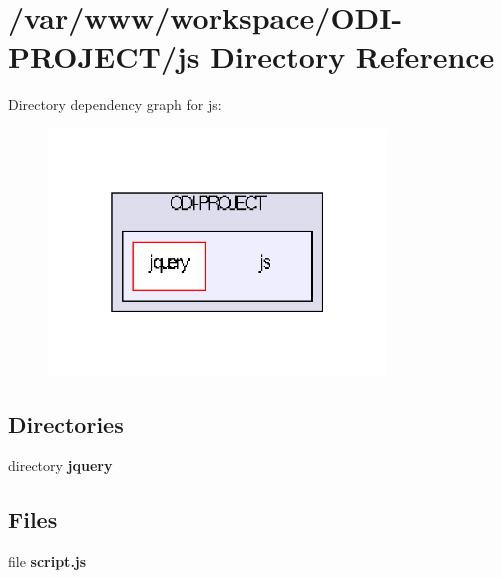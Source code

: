 \section{/var/www/workspace/\+O\+D\+I-\/\+P\+R\+O\+J\+E\+C\+T/js Directory Reference}
\label{dir_df3b9a83a1cda829cd6b2f25cbf1d429}
Directory dependency graph for js\+:\nopagebreak
\begin{figure}[H]
\begin{center}
\leavevmode
\includegraphics[width=254pt]{dir_df3b9a83a1cda829cd6b2f25cbf1d429_dep}
\end{center}
\end{figure}
\subsection*{Directories}
\begin{DoxyCompactItemize}
\item 
directory {\bf jquery}
\end{DoxyCompactItemize}
\subsection*{Files}
\begin{DoxyCompactItemize}
\item 
file {\bfseries script.\+js}
\end{DoxyCompactItemize}

